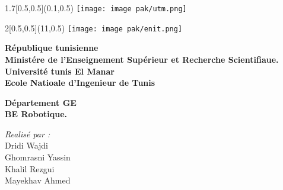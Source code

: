 

\begin{titlepage}
  \thispagestyle{empty}
  \BgThispage

  \begin{textblock}{1.7}[0.5,0.5](0.1,0.5)
    \texttt{[image: image pak/utm.png]}%
  \end{textblock}

  \begin{textblock}{2}[0.5,0.5](11,0.5)
    \texttt{[image: image pak/enit.png]}%
  \end{textblock}

  \vspace*{0\baselineskip}
  \begin{center}
    \begin{minipage}[t]{0.83\linewidth}\centering
      {\tiny
        \parindent=0pt
        \textbf{République tunisienne }\\[0.1cm]
        \textbf{ Ministére de l'Enseignement Supérieur et Recherche Scientifiaue. }\\[0.1cm]
        \textbf{Université tunis El Manar}\\[0.1cm]
        \textbf{Ecole Natioale d'Ingenieur de Tunis }
      }
    \end{minipage}

    \vspace{1.2cm}

    {\Large \textbf{Département GE }}\\[0.5cm]
    {\LARGE \textbf{BE Robotique.}}

    \bigskip\bigskip

    \setlength{\fboxrule}{0.6pt}

    \bigskip

    {\large \emph{Realisé par :}}\\[0.25cm]
    { Dridi Wajdi }\\[0.25cm]
    {Ghomrasni Yassin}\\[0.25cm]
    {Khalil Rezgui}\\[0.25cm]
    { Mayekhav Ahmed}\\[0.25cm]


\end{center}
\end{titlepage}

